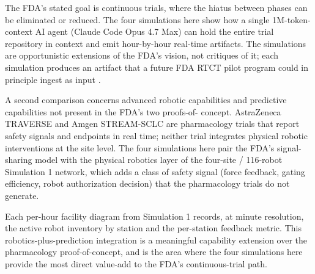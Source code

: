 The FDA's stated goal is continuous trials, where the hiatus between
phases can be eliminated or reduced. The four simulations here show
how a single 1M-token-context AI agent (Claude Code Opus 4.7 Max) can
hold the entire trial repository in context and emit hour-by-hour
real-time artifacts. The simulations are opportunistic extensions of
the FDA's vision, not critiques of it; each simulation produces an
artifact that a future FDA RTCT pilot program could in principle
ingest as input \cite{kawchak_2026_19176370,
kawchak_2026_19119939, kawchak_2026_19396256}.

A second comparison concerns advanced robotic capabilities and
predictive capabilities not present in the FDA's two proofs-of-
concept. AstraZeneca TRAVERSE and Amgen STREAM-SCLC are pharmacology
trials that report safety signals and endpoints in real time; neither
trial integrates physical robotic interventions at the site level.
The four simulations here pair the FDA's signal-sharing model with
the physical robotics layer of the four-site / 116-robot Simulation 1
network, which adds a class of safety signal (force feedback, gating
efficiency, robot authorization decision) that the pharmacology
trials do not generate. 

Each per-hour facility diagram from
Simulation 1 records, at minute resolution, the active robot
inventory by station and the per-station feedback metric. This
robotics-plus-prediction integration is a meaningful capability
extension over the pharmacology proof-of-concept, and is the area
where the four simulations here provide the most direct value-add to
the FDA's continuous-trial path.

\clearpage


